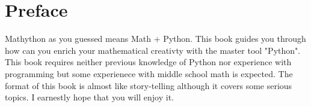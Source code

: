 \frontmatter
\chapter*{Preface}
Mathython as you guessed means Math + Python. This book guides you through how can you enrich your mathematical creativty with the master tool "Python". This book requires neither previous knowledge of Python nor experience with programming but some experienece with middle school math is expected. The format of this book is almost like story-telling although it covers some serious topics. I earnestly hope that you will enjoy it.